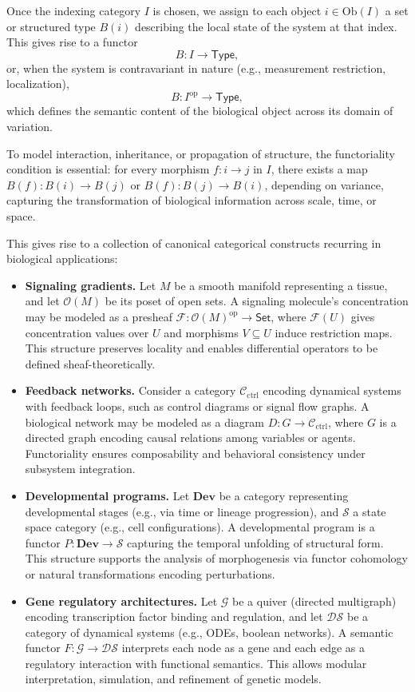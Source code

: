 Once the indexing category $I$ is chosen, we assign to each object $i \in \mathrm{Ob}(I)$ a set or structured type $B(i)$ describing the local state of the system at that index. This gives rise to a functor
\[
B : I \to \mathsf{Type},
\]
or, when the system is contravariant in nature (e.g., measurement restriction, localization),
\[
B : I^{\mathrm{op}} \to \mathsf{Type},
\]
which defines the semantic content of the biological object across its domain of variation.

To model interaction, inheritance, or propagation of structure, the functoriality condition is essential: for every morphism $f : i \to j$ in $I$, there exists a map $B(f) : B(i) \to B(j)$ or $B(f) : B(j) \to B(i)$, depending on variance, capturing the transformation of biological information across scale, time, or space.

This gives rise to a collection of canonical categorical constructs recurring in biological applications:

\begin{itemize}
  \item \textbf{Signaling gradients.} Let $M$ be a smooth manifold representing a tissue, and let $\mathcal{O}(M)$ be its poset of open sets. A signaling molecule’s concentration may be modeled as a presheaf $\mathscr{F} : \mathcal{O}(M)^{\mathrm{op}} \to \mathsf{Set}$, where $\mathscr{F}(U)$ gives concentration values over $U$ and morphisms $V \subseteq U$ induce restriction maps. This structure preserves locality and enables differential operators to be defined sheaf-theoretically.
  
  \item \textbf{Feedback networks.} Consider a category $\mathcal{C}_{\text{ctrl}}$ encoding dynamical systems with feedback loops, such as control diagrams or signal flow graphs. A biological network may be modeled as a diagram $D : G \to \mathcal{C}_{\text{ctrl}}$, where $G$ is a directed graph encoding causal relations among variables or agents. Functoriality ensures composability and behavioral consistency under subsystem integration.
  
  \item \textbf{Developmental programs.} Let $\mathbf{Dev}$ be a category representing developmental stages (e.g., via time or lineage progression), and $\mathcal{S}$ a state space category (e.g., cell configurations). A developmental program is a functor $P : \mathbf{Dev} \to \mathcal{S}$ capturing the temporal unfolding of structural form. This structure supports the analysis of morphogenesis via functor cohomology or natural transformations encoding perturbations.
  
  \item \textbf{Gene regulatory architectures.} Let $\mathcal{G}$ be a quiver (directed multigraph) encoding transcription factor binding and regulation, and let $\mathcal{D}\mathcal{S}$ be a category of dynamical systems (e.g., ODEs, boolean networks). A semantic functor $F : \mathcal{G} \to \mathcal{D}\mathcal{S}$ interprets each node as a gene and each edge as a regulatory interaction with functional semantics. This allows modular interpretation, simulation, and refinement of genetic models.
\end{itemize}


